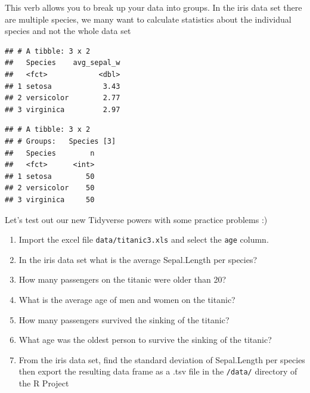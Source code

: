 \documentclass[
]{article}
\newenvironment{Shaded}{\begin{snugshade}}{\end{snugshade}}
\newcommand{\CommentTok}[1]{\textcolor[rgb]{0.56,0.35,0.01}{\textit{#1}}}
\newcommand{\DataTypeTok}[1]{\textcolor[rgb]{0.13,0.29,0.53}{#1}}
\newcommand{\KeywordTok}[1]{\textcolor[rgb]{0.13,0.29,0.53}{\textbf{#1}}}
\newcommand{\NormalTok}[1]{#1}
\newcommand{\OperatorTok}[1]{\textcolor[rgb]{0.81,0.36,0.00}{\textbf{#1}}}
\newcommand{\StringTok}[1]{\textcolor[rgb]{0.31,0.60,0.02}{#1}}
\begin{document}
This verb allows you to break up your data into groups. In the iris data
set there are multiple species, we many want to calculate statistics
about the individual species and not the whole data set

\begin{Shaded}
\end{Shaded}

\begin{verbatim}
## # A tibble: 3 x 2
##   Species    avg_sepal_w
##   <fct>            <dbl>
## 1 setosa            3.43
## 2 versicolor        2.77
## 3 virginica         2.97
\end{verbatim}

\begin{Shaded}
\end{Shaded}

\begin{verbatim}
## # A tibble: 3 x 2
## # Groups:   Species [3]
##   Species        n
##   <fct>      <int>
## 1 setosa        50
## 2 versicolor    50
## 3 virginica     50
\end{verbatim}

Let's test out our new Tidyverse powers with some practice problems :)

\begin{enumerate}
\def\labelenumi{\arabic{enumi}.}
\item
  Import the excel file \texttt{data/titanic3.xls} and select the
  \texttt{age} column.
\item
  In the iris data set what is the average Sepal.Length per species?
\item
  How many passengers on the titanic were older than 20?
\item
  What is the average age of men and women on the titanic?
\item
  How many passengers survived the sinking of the titanic?
\item
  What age was the oldest person to survive the sinking of the titanic?
\item
  From the iris data set, find the standard deviation of Sepal.Length
  per species then export the resulting data frame as a .tsv file in the
  \texttt{/data/} directory of the R Project
\end{enumerate}
\end{document}
